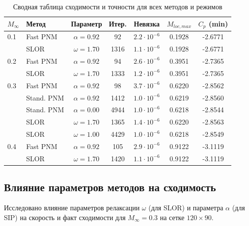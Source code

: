\documentclass[a4paper,12pt]{article}
\begin{document}
	\begin{table}[H]
		\centering
		\caption{Сводная таблица сходимости и точности для всех методов и режимов}
		\label{tab:large_convergence}
		\begin{tabular}{llccccc}
			\toprule
			$M_\infty$ & Метод & Параметр & Итер. & Невязка & $M_{loc, max}$ & $C_p$ (min) \\
			\midrule
			0.1 & Fast PNM & $\alpha=0.92$ & 92 & $2.2\cdot 10^{-6}$ & 0.1928 & -2.6771 \\
			    & SLOR     & $\omega=1.70$ & 1316 & $1.1\cdot 10^{-6}$ & 0.1928 & -2.6771 \\
			\midrule
			0.2 & Fast PNM & $\alpha=0.92$ & 94 & $2.6\cdot 10^{-6}$ & 0.3951 & -2.7365 \\
			    & SLOR     & $\omega=1.70$ & 1333 & $1.2\cdot 10^{-6}$ & 0.3951 & -2.7365 \\
			\midrule
			0.3 & Fast PNM & $\alpha=0.92$ & 98 & $3.7\cdot 10^{-6}$ & 0.6220 & -2.8562 \\
			    & Stand. PNM & $\alpha=0.92$ & 1412 & $1.0\cdot 10^{-6}$ & 0.6219 & -2.8560 \\
			    & Stand. PNM & $\alpha=0.00$ & 4944 & $1.0\cdot 10^{-6}$ & 0.6218 & -2.8544 \\
			    & SLOR     & $\omega=1.70$ & 1365 & $1.4\cdot 10^{-6}$ & 0.6220 & -2.8563 \\
			    & SLOR     & $\omega=1.00$ & 4429 & $1.0\cdot 10^{-6}$ & 0.6218 & -2.8549 \\
			\midrule
			0.4 & Fast PNM & $\alpha=0.92$ & 105 & $2.9\cdot 10^{-6}$ & 0.9122 & -3.1119 \\
			    & SLOR     & $\omega=1.70$ & 1420 & $1.1\cdot 10^{-6}$ & 0.9122 & -3.1119 \\
			\bottomrule
		\end{tabular}
	\end{table}

	\subsection{Влияние параметров методов на сходимость}

	Исследовано влияние параметров релаксации $\omega$ (для SLOR) и параметра $\alpha$ (для SIP) на скорость и факт сходимости для $M_\infty = 0.3$ на сетке $120 \times 90$.
\end{document}

